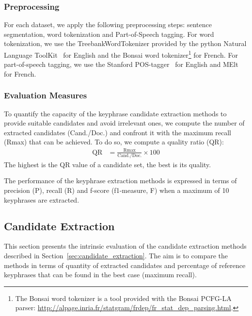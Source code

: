     \subsubsection{Preprocessing}
    \label{subsubsec:preprocessing}
      For each dataset, we apply the following preprocessing steps: sentence
      segmentation, word tokenization and Part-of-Speech tagging. For word
      tokenization, we use the TreebankWordTokenizer provided by the python
      Natural Language ToolKit~\cite{bird2009nltk} for English and the Bonsai
      word tokenizer\footnote{The Bonsai word tokenizer is a tool provided with
      the Bonsai PCFG-LA parser:
      \url{http://alpage.inria.fr/statgram/frdep/fr_stat_dep_parsing.html}.} for
      French. For part-of-speech tagging, we use the Stanford
      POS-tagger~\cite{toutanova2003stanfordpostagger} for English and
      MElt~\cite{denis2009melt} for French.

    \subsubsection{Evaluation Measures}
    \label{subsubsec:keyphrase_extraction_evaluation_measures}
      To quantify the capacity of the keyphrase candidate extraction methods to
      provide suitable candidates and avoid irrelevant ones, we compute the
      number of extracted candidates (Cand./Doc.) and confront it with the
      maximum recall (Rmax) that can be achieved. To do so, we compute a quality
      ratio (QR):
      \begin{align}
        \text{QR} &= \frac{\text{Rmax}}{\text{Cand./Doc.}} \times 100
      \end{align}
      The highest is the QR value of a candidate set, the best is its quality.

      The performance of the keyphrase extraction methods is expressed in terms
      of precision (P), recall (R) and f-score (f1-measure, F) when a maximum of
      10 keyphrases are extracted.

  \subsection{Candidate Extraction}
  \label{subsec:candidate_extraction}

    This section presents the intrinsic evaluation of the candidate extraction
    methods described in Section~\ref{sec:candidate_extraction}. The aim is to
    compare the methods in terms of quantity of extracted candidates and
    percentage of reference keyphrases that can be found in the best case
    (maximum recall).

